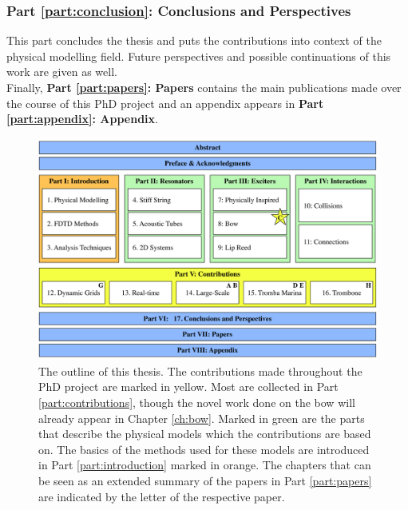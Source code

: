 \subsubsection{Part \ref{part:conclusion}: Conclusions and Perspectives}
This part concludes the thesis and puts the contributions into context of the physical modelling field. Future perspectives and possible continuations of this work are given as well.
\\

Finally, \textbf{Part \ref{part:papers}: Papers} contains the main publications made over the course of this PhD project and an appendix appears in \textbf{Part \ref{part:appendix}: Appendix}.

\begin{figure}[h]
    \centering
    \includegraphics[width=\textwidth]{figures/intro/thesisOverview.pdf}
    \caption{\label{fig:thesisOutline} The outline of this thesis. The contributions made throughout the PhD project are marked in yellow. Most are collected in Part \ref{part:contributions}, though the novel work done on the bow will already appear in Chapter \ref{ch:bow}. Marked in green are the parts that describe the physical models which the contributions are based on. The basics of the methods used for these models are introduced in Part \ref{part:introduction} marked in orange. The chapters that can be seen as an extended summary of the papers in Part \ref{part:papers} are indicated by the letter of the respective paper.}
\end{figure}